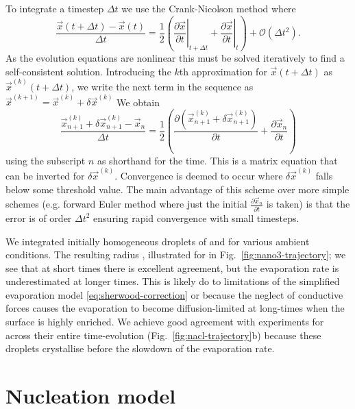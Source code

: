 \documentclass[11pt,twoside]{report}
\begin{document}
To integrate a timestep $\Delta t$ we use the Crank-Nicolson \cite{CrankMPCPS1947} method where
\begin{equation*}
  \frac{\vec{x}(t + \Delta t) - \vec{x}(t)}{\Delta t}
  =
  \frac{1}{2}
  \left(
  \left. \frac{\partial \vec{x}}{\partial t} \right|_{t + \Delta t}
  +
  \left. \frac{\partial \vec{x}}{\partial t} \right|_t
  \right)
  + \mathcal{O}(\Delta t^2).
\end{equation*}
As the evolution equations are nonlinear this must be solved iteratively to find a self-consistent solution.
Introducing the $k$th approximation for $\vec{x}(t + \Delta t)$ as $\vec{x}^{(k)}(t + \Delta t)$, we write the next term in the sequence as $\vec{x}^{(k+1)} = \vec{x}^{(k)} + \delta \vec{x}^{(k)}$
We obtain
\begin{equation*}
  \frac{\vec{x}_{n+1}^{(k)} + \delta\vec{x}_{n+1}^{(k)} - \vec{x}_n}{\Delta t}
  =
  \frac{1}{2}
  \left(
  \frac{\partial (\vec{x}_{n+1}^{(k)} + \delta\vec{x}_{n+1}^{(k)})}{\partial t}
  +
  \frac{\partial \vec{x}_n}{\partial t}
  \right)
\end{equation*}
using the subscript $n$ as shorthand for the time.
This is a matrix equation that can be inverted for $\delta \vec{x}^{(k)}$.
Convergence is deemed to occur where $\delta \vec{x}^{(k)}$ falls below some threshold value.
The main advantage of this scheme over more simple schemes (e.g. forward Euler method where just the initial $\frac{\partial \vec{x}_n}{\partial t}$ is taken) is that the error is of order $\Delta t^2$ ensuring rapid convergence with small timesteps.

We integrated initially homogeneous droplets of  and  for various ambient conditions.
The resulting radius , illustrated for  in Fig.\ \ref{fig:nano3-trajectory}; we see that at short times there is excellent agreement, but the evaporation rate is underestimated at longer times.
This is likely do to limitations of the simplified evaporation model \eqref{eq:sherwood-correction} or because the neglect of conductive forces causes the evaporation to become diffusion-limited at long-times when the surface is highly enriched.
We achieve good agreement with experiments for  across their entire time-evolution (Fig.\ \ref{fig:nacl-trajectory}b) because these droplets crystallise before the slowdown of the evaporation rate.

\section{Nucleation model}
\label{sec:nucleation}
\end{document}
